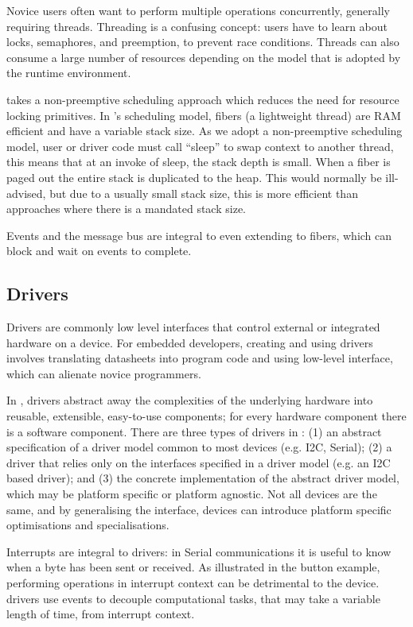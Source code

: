 Novice users often want to perform multiple operations concurrently, generally requiring threads. Threading is a confusing concept: users have to learn about locks, semaphores, and preemption, to prevent race conditions. Threads can also consume a large number of resources depending on the model that is adopted by the runtime environment.

\CO takes a non-preemptive scheduling approach which reduces the need for resource locking primitives. In \CON's scheduling model, fibers (a lightweight thread) are RAM efficient and have a variable stack size. As we adopt a non-preemptive scheduling model, user or driver code must call ``sleep'' to swap context to another thread, this means that at an invoke of sleep, the stack depth is small. When a fiber is paged out the entire stack is duplicated to the heap. This would normally be ill-advised, but due to a usually small stack size, this is more efficient than approaches where there is a mandated stack size.

Events and the message bus are integral to \CO even extending to fibers, which can block and wait on events to complete.

\subsection{Drivers}

Drivers are commonly low level interfaces that control external or integrated hardware on a device. For embedded developers, creating and using drivers involves translating datasheets into program code and using low-level interface, which can alienate novice programmers.

In \CON, drivers abstract away the complexities of the underlying hardware into reusable, extensible, easy-to-use components; for every hardware component there is a software component. There are three types of drivers in \CON: (1) an abstract specification of a driver model common to most devices (e.g. I2C, Serial); (2) a driver that relies only on the interfaces specified in a driver model  (e.g. an I2C based driver); and (3) the concrete implementation of the abstract driver model, which may be platform specific or platform agnostic. Not all devices are the same, and by generalising the interface, devices can introduce platform specific optimisations and specialisations.

Interrupts are integral to drivers: in Serial communications it is useful to know when a byte has been sent or received. As illustrated in the button example, performing operations in interrupt context can be detrimental to the device. \CO drivers use events to decouple computational tasks, that may take a variable length of time, from interrupt context.

